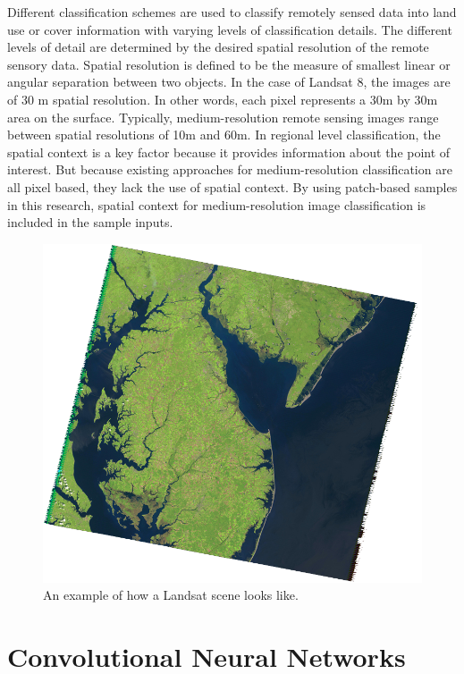 \documentclass[letterpaper, 10 pt, conference]{ieeeconf}  %
\begin{document}
Different classification schemes are used to classify remotely sensed data into land use or cover information with varying levels of classification details. The different levels of detail are determined by the desired spatial resolution of the remote sensory data. Spatial resolution is defined to be the measure of smallest linear or angular separation between two objects. In the case of Landsat 8, the images are of 30 m spatial resolution. In other words, each pixel represents a 30m by 30m area on the surface. Typically, medium-resolution remote sensing images range between spatial resolutions of 10m and 60m. In regional level classification, the spatial context is a key factor because it provides information about the point of interest. But because existing approaches for medium-resolution classification are all pixel based, they lack the use of spatial context. By using patch-based samples in this research, spatial context for medium-resolution image classification is included in the sample inputs.

   \begin{figure}[thpb]
	\centering
	\includegraphics[scale=0.2]{landsat.png}
	\caption{An example of how a Landsat scene looks like.}
	\label{figurelabel}
\end{figure}

\section{Convolutional Neural Networks}
\end{document}
